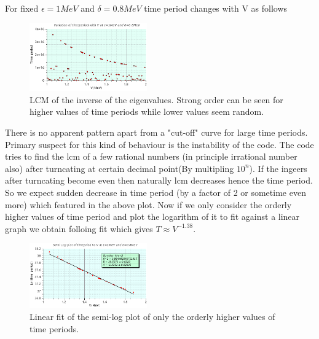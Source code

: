 \documentclass[a4paper,two column]{article}
\begin{document}
\begin{itemize}
            For fixed $\epsilon=1MeV$ and $\delta = 0.8MeV$ time period changes with V as follows
            \begin{figure}[H]
                \centering
                \includegraphics[width=0.45\textwidth,fbox]{image/variationV}
                \caption{LCM of the inverse of the eigenvalues. Strong order can be seen for higher values of time periods while lower values seem random.}
                \label{fig:variationV}
            \end{figure}
            There is no apparent pattern apart from  a "cut-off" curve for large time periods. Primary suspect for this kind of behaviour is the instability of the code. The code tries to find the lcm of a few rational numbers (in principle irrational number also) after turncating at certain decimal point(By multipling $10^n$). If the ingeers after turncating become even then naturally lcm decreases hence the time period. So we expect sudden decrease in time period (by a factor of 2 or sometime even more) which featured in the above plot. Now if we only consider the orderly higher values of time period and plot the logarithm of it to fit against a linear graph we obtain folloing fit which gives $T \approx V^{-1.38}$.
            \begin{figure}[H]
                \centering
                \includegraphics[width=0.45\textwidth,fbox]{image/semilogvariationV}
                \caption{Linear fit of the semi-log plot of only the orderly higher values of time periods.}
                \label{fig:semilogplot}
            \end{figure} 
            \end{itemize}
\end{document}
